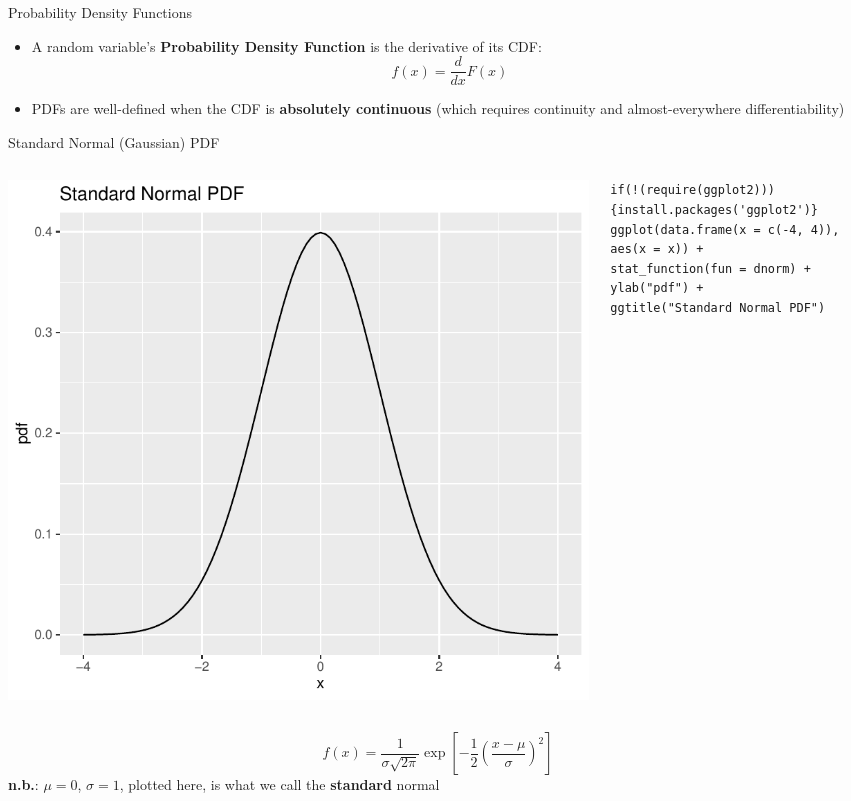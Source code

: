 \documentclass[aspectratio=169,11pt]{beamer}
\begin{document}
\begin{frame}{Probability Density Functions}
\begin{itemize}
	\item A random variable's {\bf Probability Density Function} is the derivative of its CDF:
		\[
		 	f(x) = \frac{d}{dx}F(x)
		\]
		
	\medskip
	\item PDFs are well-defined when the CDF is {\bf absolutely continuous} (which requires continuity and almost-everywhere differentiability)
\end{itemize}
\end{frame}



\begin{frame}[fragile]{Standard Normal (Gaussian) PDF}
\begin{columns}
\begin{column}{0.5\textwidth}
\begin{center}
\includegraphics[height=.5\textheight]{normal-pdf} 
\end{center}
\end{column}
\begin{column}{0.5\textwidth} 
\begin{lstlisting}
if(!(require(ggplot2))){install.packages('ggplot2')}
ggplot(data.frame(x = c(-4, 4)), aes(x = x)) +
stat_function(fun = dnorm) + 
ylab("pdf") +
ggtitle("Standard Normal PDF") 
\end{lstlisting}
\end{column}
\end{columns}
\[
f\left(x\right) = \frac{1}{\sigma \sqrt{2 \pi}} \exp\left[ -\frac{1}{2}\left(\frac{x-\mu}{\sigma}\right)^2\right]
\]
{\bf n.b.}: $\mu=0$, $\sigma=1$, plotted here, is what we call the {\bf standard} normal
\end{frame}
\end{document}
